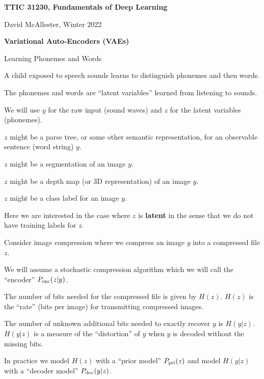 




{\Huge

  \centerline{\bf TTIC 31230, Fundamentals of Deep Learning}
  \bigskip
  \centerline{David McAllester, Winter 2022}
  \vfill
  \vfill
  \centerline{\bf Variational Auto-Encoders (VAEs)}
  \vfill
  \vfill

{Learning Phonemes and Words}

A child exposed to speech sounds learns to distinguish phonemes and then words.

\vfill
The phonemes and words are ``latent variables'' learned from listening to sounds.

\vfill
We will use $y$ for the raw input (sound waves) and $z$ for the latent variables (phonemes).


$z$ might be a parse tree, or some other semantic representation, for an observable sentence (word string) $y$.

\vfill
$z$ might be a segmentation of an image $y$.

\vfill
$z$ might be a depth map (or 3D representation) of an image $y$.

\vfill
$z$ might be a class label for an image $y$.

\vfill
Here we are interested in the case where $z$ is {\bf latent} in the sense that we do not have training labels for $z$.


Consider image compression where we compress an image $y$ into a compressed file $z$.

\vfill
We will assume a stochastic compression algorithm
which we will call the ``encoder'' $P_{\mathrm{enc}}(z|y)$.

\vfill
The number of bits needed for the compressed file is given by $H(z)$.  $H(z)$
is the ``rate'' (bits per image) for transmitting compressed images.

\vfill
The number of unknown additional bits needed to exactly recover $y$ is $H(y|z)$.
$H(y|z)$ is a measure of the ``distortion'' of $y$ when $y$ is decoded without the missing bits.


In practice we model $H(z)$ with a ``prior model'' $P_{\mathrm{pri}}(z)$ and model $H(y|z)$ with a ``decoder model''
$P_{\mathrm{dec}}(y|z)$.

}
